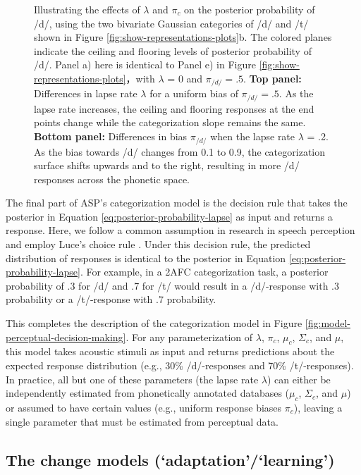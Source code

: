 \documentclass[
  11pt,
  man,floatsintext]{apa6}
\begin{document}
\begin{figure}
\caption{Illustrating the effects of \(\lambda\) and \(\pi_c\) on the posterior probability of /d/, using the two bivariate Gaussian categories of /d/ and /t/ shown in Figure \ref{fig:show-representations-plots}b. The colored planes indicate the ceiling and flooring levels of posterior probability of /d/. Panel a) here is identical to Panel e) in Figure \ref{fig:show-representations-plots}，with \(\lambda\) = 0 and \(\pi_{/d/}=.5\). \textbf{Top panel:} Differences in lapse rate \(\lambda\) for a uniform bias of \(\pi_{/d/}=.5\). As the lapse rate increases, the ceiling and flooring responses at the end points change while the categorization slope remains the same. \textbf{Bottom panel:} Differences in bias \(\pi_{/d/}\) when the lapse rate \(\lambda\) = .2. As the bias towards /d/ changes from 0.1 to 0.9, the categorization surface shifts upwards and to the right, resulting in more /d/ responses across the phonetic space.}\label{fig:show-lapse-bias-demonstration-plots}
\end{figure}

The final part of ASP's categorization model is the decision rule that takes the posterior in Equation \eqref{eq:posterior-probability-lapse} as input and returns a response. Here, we follow a common assumption in research in speech perception and employ Luce's choice rule \autocites{luce1959}[for a comparison of decision rules, see][]{massaro-friedman1990}. Under this decision rule, the predicted distribution of responses is identical to the posterior in Equation \eqref{eq:posterior-probability-lapse}. For example, in a 2AFC categorization task, a posterior probability of .3 for /d/ and .7 for /t/ would result in a /d/-response with .3 probability or a /t/-response with .7 probability.

This completes the description of the categorization model in Figure \ref{fig:model-perceptual-decision-making}. For any parameterization of \(\lambda\), \(\pi_c\), \(\mu_c\), \(\Sigma_c\), and \(\mu\), this model takes acoustic stimuli as input and returns predictions about the expected response distribution (e.g., 30\% /d/-responses and 70\% /t/-responses). In practice, all but one of these parameters (the lapse rate \(\lambda\)) can either be independently estimated from phonetically annotated databases (\(\mu_c\), \(\Sigma_c\), and \(\mu\)) or assumed to have certain values (e.g., uniform response biases \(\pi_c\)), leaving a single parameter that must be estimated from perceptual data.

\subsection{The change models (`adaptation'/`learning')}\label{sec:change-models}
\end{document}
